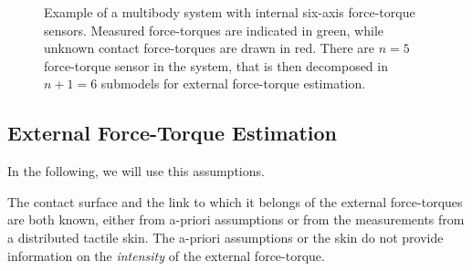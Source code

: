 \begin{figure}
\caption{Example of a multibody system with internal six-axis force-torque sensors. Measured force-torques are indicated in green, while unknown contact force-torques are drawn in red. There are $n = 5$ force-torque sensor in the system, that is then decomposed in $n+1 = 6$ submodels for external force-torque estimation.}
\label{fig:extFTsMultiBody}
\end{figure}


\subsection{External Force-Torque Estimation}
In the following, we will use this assumptions. 

\begin{assumption}
The contact surface and the link to which it belongs of the  external force-torques are both known, either from a-priori assumptions or from the measurements from a distributed tactile skin. The a-priori assumptions or the skin do not provide information on the \emph{intensity} of the external force-torque. 
\end{assumption}

